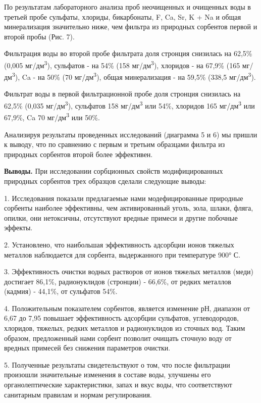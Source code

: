 По результатам лабораторного анализа проб неочищенных и очищенных воды в
третьей пробе сульфаты, хлориды, бикарбонаты, F, Ca, Sr, K + Na и общая
минерализация значительно ниже, чем фильтра из природных сорбентов
первой и второй пробы (Рис. 7).

Фильтрация воды во второй пробе фильтрата доля стронция снизилась на
62,5\% (0,005 мг/дм\textsuperscript{3}), сульфатов - на 54\% (158
мг/дм\textsuperscript{3}), хлоридов - на 67,9\% (165
мг/дм\textsuperscript{3}), Ca - на 50\% (70 мг/дм\textsuperscript{3}),
общая минерализация - на 59,5\% (338,5 мг/дм\textsuperscript{3}).

Фильтрат воды в первой фильтрационной пробе доля стронция снизилась на
62,5\% (0,035 мг/дм\textsuperscript{3}), сульфатов 158
мг/дм\textsuperscript{3} или 54\%, хлоридов 165 мг/дм\textsuperscript{3}
или 67,9\%, Ca 70 мг/дм\textsuperscript{3} или 50\%.

Анализируя результаты проведенных исследований (диаграмма 5 и 6) мы
пришли к выводу, что по сравнению с первым и третьим образцами фильтра
из природных сорбентов второй более эффективен.

{\bfseries Выводы.} При исследовании сорбционных свойств модифицированных
природных сорбентов трех образцов сделали следующие выводы:

1. Исследования показали предлагаемые нами модефицированные природные
сорбенты наиболее эффективны, чем активированный уголь, зола, шлаки,
фляга, опилки, они нетоксичны, отсутствуют вредные примеси и другие
побочные эффекты.

2. Установлено, что наибольшая эффективность адсорбции ионов тяжелых
металлов наблюдается для сорбента, выдержанного при температуре 900° С.

3. Эффективность очистки водных растворов от ионов тяжелых металлов
(меди) достигает 86,1\%, радионуклидов (стронции) - 66,6\%, от редких
металлов (кадмия) - 44,1\%, от сульфатов 54\%.

4. Положительным показателем сорбентов, является изменение рН, диапазон
от 6,67 до 7,95 повышает эффективность адсорбции сульфатов,
углеводородов, хлоридов, тяжелых, редких металлов и радионуклидов из
сточных вод. Таким образом, предложенный нами сорбент позволит очищать
сточную воду от вредных примесей без снижения параметров очистки.

5. Полученные результаты свидетельствуют о том, что после фильтрации
произошли значительные изменения в составе воды, улучшены его
органолептические характеристики, запах и вкус воды, что соответствуют
санитарным правилам и нормам регулирования.

